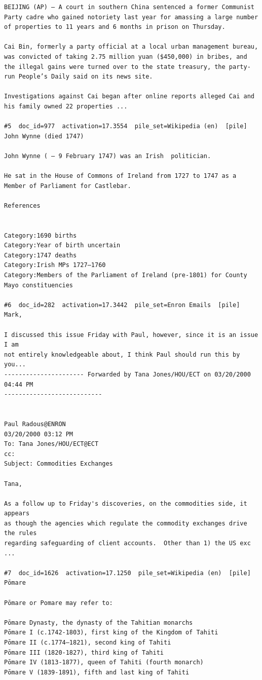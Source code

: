 \begin{verbatim}
BEIJING (AP) — A court in southern China sentenced a former Communist Party cadre who gained notoriety last year for amassing a large number of properties to 11 years and 6 months in prison on Thursday.

Cai Bin, formerly a party official at a local urban management bureau, was convicted of taking 2.75 million yuan ($450,000) in bribes, and the illegal gains were turned over to the state treasury, the party-run People’s Daily said on its news site.

Investigations against Cai began after online reports alleged Cai and his family owned 22 properties ...

#5  doc_id=977  activation=17.3554  pile_set=Wikipedia (en)  [pile]
John Wynne (died 1747)

John Wynne ( – 9 February 1747) was an Irish  politician.

He sat in the House of Commons of Ireland from 1727 to 1747 as a Member of Parliament for Castlebar.

References 
 

Category:1690 births
Category:Year of birth uncertain
Category:1747 deaths
Category:Irish MPs 1727–1760
Category:Members of the Parliament of Ireland (pre-1801) for County Mayo constituencies

#6  doc_id=282  activation=17.3442  pile_set=Enron Emails  [pile]
Mark,

I discussed this issue Friday with Paul, however, since it is an issue I am 
not entirely knowledgeable about, I think Paul should run this by you...
---------------------- Forwarded by Tana Jones/HOU/ECT on 03/20/2000 04:44 PM 
---------------------------


Paul Radous@ENRON
03/20/2000 03:12 PM
To: Tana Jones/HOU/ECT@ECT
cc:  
Subject: Commodities Exchanges

Tana,

As a follow up to Friday's discoveries, on the commodities side, it appears 
as though the agencies which regulate the commodity exchanges drive the rules 
regarding safeguarding of client accounts.  Other than 1) the US exc ...

#7  doc_id=1626  activation=17.1250  pile_set=Wikipedia (en)  [pile]
Pōmare

Pōmare or Pomare may refer to:

Pōmare Dynasty, the dynasty of the Tahitian monarchs
Pōmare I (c.1742-1803), first king of the Kingdom of Tahiti
Pōmare II (c.1774–1821), second king of Tahiti
Pōmare III (1820-1827), third king of Tahiti
Pōmare IV (1813-1877), queen of Tahiti (fourth monarch)
Pōmare V (1839-1891), fifth and last king of Tahiti


\end{verbatim}
